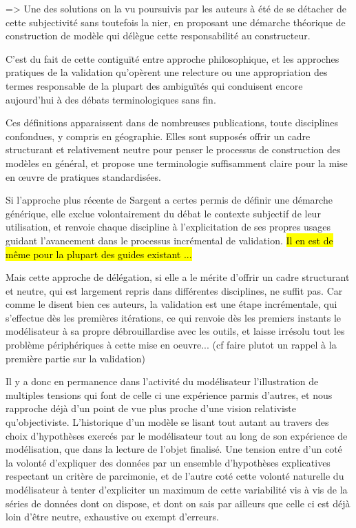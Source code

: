 

=> Une des solutions on la vu poursuivis par les auteurs à été de se détacher de cette subjectivité sans toutefois la nier, en proposant une démarche théorique de construction de modèle qui délègue cette responsabilité au constructeur.

C'est du fait de cette contiguïté entre approche philosophique, et les approches pratiques de la validation qu'opèrent une relecture ou une appropriation des termes responsable de la plupart des ambiguïtés qui conduisent encore aujourd'hui à des débats terminologiques sans fin. \autocite{David2009}

Ces définitions apparaissent dans de nombreuses publications, toute disciplines confondues, y compris en géographie. Elles sont supposés offrir un cadre structurant et relativement neutre pour penser le processus de construction des modèles en général, et propose une terminologie suffisamment claire pour la mise en œuvre de pratiques standardisées.

Si l'approche plus récente de Sargent a certes permis de définir une démarche générique, elle exclue volontairement du débat le contexte subjectif de leur utilisation, et renvoie chaque discipline à l'explicitation de ses propres usages guidant l'avancement dans le processus incrémental de validation. \hl{Il en est de même pour la plupart des guides existant ...}

Mais cette approche de délégation, si elle a le mérite d'offrir un cadre structurant et neutre, qui est largement repris dans différentes disciplines, ne suffit pas. Car comme le disent bien ces auteurs, la validation est une étape incrémentale, qui s'effectue dès les premières itérations, ce qui renvoie dès les premiers instants le modélisateur à sa propre débrouillardise avec les outils, et laisse irrésolu tout les problème périphériques à cette mise en oeuvre... (cf faire plutot un rappel à la première partie sur la validation)

Il y a donc en permanence dans l'activité du modélisateur l'illustration de multiples tensions qui font de celle ci une expérience parmis d'autres, et nous rapproche déjà d'un point de vue plus proche d'une vision relativiste qu'objectiviste. L'historique d'un modèle se lisant tout autant au travers des choix d'hypothèses exercés par le modélisateur tout au long de son expérience de modélisation, que dans la lecture de l'objet finalisé. Une tension entre d'un coté la volonté d'expliquer des données par un ensemble d'hypothèses explicatives respectant un critère de parcimonie, et de l'autre coté cette volonté naturelle du modélisateur à tenter d'expliciter un maximum de cette variabilité vis à vis de la séries de données dont on dispose, et dont on sais par ailleurs que celle ci est déjà loin d'être neutre, exhaustive ou exempt d'erreurs.

